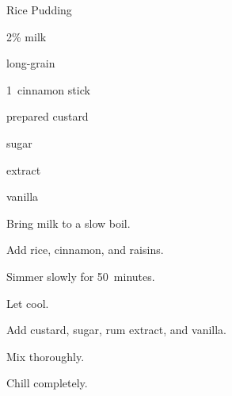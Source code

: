 \begin{recipe}{Rice Pudding}{}{}

\begin{ingredients}
\item {} 2\% milk
\item {} long-grain 
\item 1~cinnamon stick
\item \C{\quarter} 
\item \C{\third} prepared custard
\item \C{\third} sugar
\item {}  extract
\item {} vanilla
\end{ingredients}

\begin{directions}
\item Bring milk to a slow boil.
\item Add rice, cinnamon, and raisins.
\item Simmer slowly for 50~minutes.
\item Let cool.
\item Add custard, sugar, rum extract, and vanilla.
\item Mix thoroughly.
\item Chill completely.
\end{directions}

\end{recipe}
